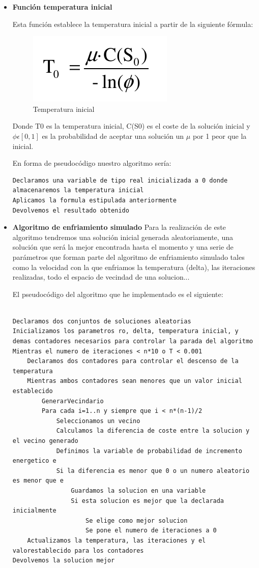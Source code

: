 		\begin{itemize}
		
		\item \textbf{Función temperatura inicial}
		
		Esta función establece la temperatura inicial a partir de la siguiente fórmula:
		
			\begin{figure}[H]
				\centering
				\includegraphics[scale=1.0]{Screenshot_3.png}
				\caption{Temperatura inicial}
				\label{}
			\end{figure}
			
		Donde T0 es la temperatura inicial, C(S0) es el coste de la solución inicial y $\phi\epsilon[0,1]$ es la probabilidad de aceptar una solución un $\mu$ por 1 peor que la inicial.	
		
		En forma de pseudocódigo nuestro algoritmo sería:	
		\begin{lstlisting}[language=SH]
Declaramos una variable de tipo real inicializada a 0 donde almacenaremos la temperatura inicial
Aplicamos la formula estipulada anteriormente
Devolvemos el resultado obtenido
		\end{lstlisting}
		
		\item \textbf{Algoritmo de enfriamiento simulado}
		Para la realización de este algoritmo tendremos una solución inicial generada aleatoriamente, una solución que será la mejor encontrada hasta el momento y una serie de parámetros que forman parte del algoritmo de enfriamiento simulado tales como la velocidad con la que enfriamos la temperatura (delta), las iteraciones realizadas, todo el espacio de vecindad de una solucion...
		
		El pseudocódigo del algoritmo que he implementado es el siguiente:
\begin{lstlisting}[language=SH]

Declaramos dos conjuntos de soluciones aleatorias
Inicializamos los parametros ro, delta, temperatura inicial, y demas contadores necesarios para controlar la parada del algoritmo
Mientras el numero de iteraciones < n*10 o T < 0.001
	Declaramos dos contadores para controlar el descenso de la temperatura
	Mientras ambos contadores sean menores que un valor inicial establecido
		GenerarVecindario
		Para cada i=1..n y siempre que i < n*(n-1)/2
			Seleccionamos un vecino
			Calculamos la diferencia de coste entre la solucion y el vecino generado
			Definimos la variable de probabilidad de incremento energetico e
			Si la diferencia es menor que 0 o un numero aleatorio es menor que e
				Guardamos la solucion en una variable
				Si esta solucion es mejor que la declarada inicialmente
					Se elige como mejor solucion
					Se pone el numero de iteraciones a 0
	Actualizamos la temperatura, las iteraciones y el valorestablecido para los contadores
Devolvemos la solucion mejor


\end{lstlisting}
\end{itemize}
